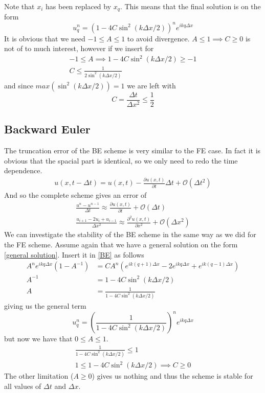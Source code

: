 \documentclass[a4paper,english, 10pt, twoside]{article}
\begin{document}
Note that $x_i$ has been replaced by $x_q$. This means that the final solution is on the form
\begin{equation*}
 u^n_q = \left(1 -4C\sin^2(k\Delta x/2)\right)^ne^{ikq\Delta x}
\end{equation*}
It is obvious that we need $-1\leq A\leq 1$ to avoid divergence. $A\leq 1 \implies C\geq 0$ is not of to much interest, however 
if we insert for 
\begin{align*}
 -1 \leq A \implies 1 -4C\sin^2(k\Delta x/2) \geq -1 \\
 C \leq \frac{1}{2\sin^2(k\Delta x/2)}
\end{align*}
and since $max(\sin^2(k\Delta x/2)) = 1$ we are left with
\begin{equation}\label{stability criterion}
 C = \frac{\Delta t}{\Delta x^2} \leq \frac{1}{2}
\end{equation}

\subsection{Backward Euler}
The truncation error of the BE scheme is very similar to the FE case. In fact it is obvious that the spacial part is identical, so 
we only need to redo the time dependence.
\begin{align*}
 u(x,t-\Delta t) = u(x,t) -\frac{\partial u(x,t)}{\partial t}\Delta t + \mathcal{O}(\Delta t^2)
\end{align*}
And so the complete scheme gives an error of
\begin{align*}
  \frac{u^{n}-u^{n-1}}{\Delta t} \approx \frac{\partial u(x,t)}{\partial t} +\mathcal{O}(\Delta t)\\
 \frac{u_{i+1}-2u_i +u_{i-1}}{\Delta x^2} \approx \frac{\partial^2 u(x,t)}{\partial x^2} +\mathcal{O}(\Delta x^2)
\end{align*}
We can investigate the stability of the BE scheme in the same way as we did for the FE scheme. Assume again that we have a general 
solution on the form \ref{general solution}. Insert it in \ref{BE} as follows
\begin{align*}
 A^ne^{ikq\Delta x}(1-A^{-1}) &= CA^n\left(e^{ik(q+1)\Delta x}-2e^{ikq\Delta x} + e^{ik(q-1)\Delta x}\right)\\
 A^{-1} &= 1-4C\sin^2(k\Delta x/2)\\
 A &= \frac{1}{1-4C\sin^2(k\Delta x/2)}
\end{align*}
giving us the general term
$$
u^n_q = \left(\frac{1}{1-4C\sin^2(k\Delta x/2)}\right)^ne^{ikq\Delta x}
$$
but now we have that $0\leq A \leq 1$. 
\begin{align*}
 \frac{1}{1-4C\sin^2(k\Delta x/2)}\leq 1 \\
 1 \leq 1-4C\sin^2(k\Delta x/2) \implies C\geq 0
\end{align*}
The other limitation ($A\geq 0$) gives us nothing and thus the scheme is stable for all values of $\Delta t$ and $\Delta x$.
\end{document}
